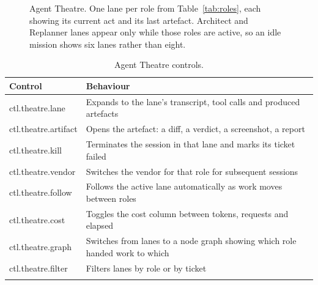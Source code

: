 \begin{figure}[h]
\centering
{}
\caption{Agent Theatre. One lane per role from Table~\ref{tab:roles}, each showing its current
act and its last artefact. Architect and Replanner lanes appear only while those roles are
active, so an idle mission shows six lanes rather than eight.}
\end{figure}

\begin{longtable}{@{}p{} p{}@{}}
\toprule
\textbf{Control} & \textbf{Behaviour} \\
\midrule
\endhead
ctl.theatre.lane & Expands to the lane's transcript, tool calls and produced artefacts \\
ctl.theatre.artifact & Opens the artefact: a diff, a verdict, a screenshot, a report \\
ctl.theatre.kill & Terminates the session in that lane and marks its ticket failed \\
ctl.theatre.vendor & Switches the vendor for that role for subsequent sessions \\
ctl.theatre.follow & Follows the active lane automatically as work moves between roles \\
ctl.theatre.cost & Toggles the cost column between tokens, requests and elapsed \\
ctl.theatre.graph & Switches from lanes to a node graph showing which role handed work to which \\
ctl.theatre.filter & Filters lanes by role or by ticket \\
\bottomrule
\caption{Agent Theatre controls.}
\end{longtable}

